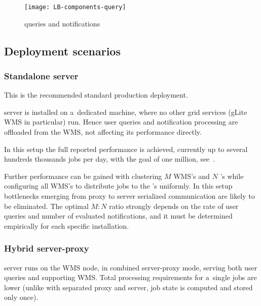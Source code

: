\begin{figure}[ht]
\centering
\texttt{[image: LB-components-query]}
\caption{\LB queries and notifications}
\label{f:comp-query}
\end{figure}




\subsection{Deployment scenarios}



\subsubsection{Standalone \LB server}
\label{deploy-stand}

This is the recommended standard production deployment.

\LB server is installed on a~dedicated machine,
where no other grid services (gLite WMS in particular) run.
Hence user queries and notification processing are offloaded 
from the WMS, not affecting its performance directly.

In this setup the full reported performance is achieved,
currently up to several hundreds thousands jobs per day, with the goal
of one million, see~\cite{lbtp}.

Further performance can be gained with clustering $M$ WMS's and $N$ \LB's
while configuring all WMS's to distribute jobs to the \LB's uniformly.
In this setup bottlenecks emerging from \LB proxy to \LB server serialized
communication are likely to be eliminated.
The optimal $M:N$ ratio strongly depends on the rate of user queries
and number of evaluated notifications,
and it must be determined empirically for each specific installation.

\subsubsection{Hybrid \LB server-proxy}
\label{deploy-hybrid}

\LB server runs on the WMS node, in combined server-proxy mode,
serving both user queries and supporting WMS.
Total processing requirements for a~single jobs are lower
(unlike with separated proxy and server, job state is computed and stored only once).


